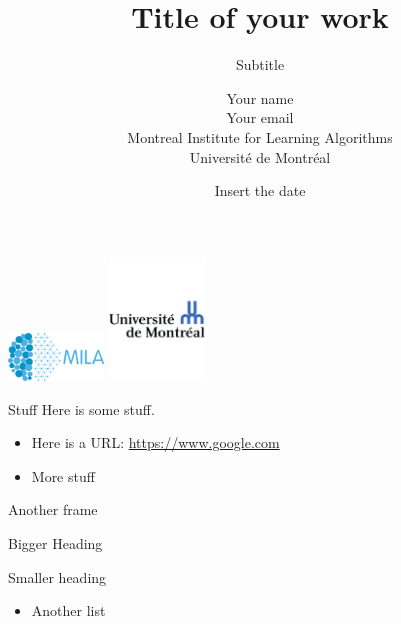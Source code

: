 \documentclass[a4paper,9pt]{beamer}
\title{Title of your work }
\subtitle{Subtitle}
\author[MILA]{%
Your name \\
Your email \\
Montreal Institute for Learning Algorithms\\
Université de Montréal}
\date{%
Insert the date
}
\begin{document}
\begin{frame}[plain]
  \titlepage
  \includegraphics[width=1in]{MILA_official_2016.png}
  \hfill
  \includegraphics[width=1in]{UdeM_logo.pdf}
\end{frame}


\begin{frame}{Stuff}
  Here is some stuff.

  \begin{itemize}
    \item Here is a URL: \url{https://www.google.com}
    \item More stuff
  \end{itemize}

\end{frame}


\begin{frame}{Another frame}
\huge
\begin{center}
Bigger Heading
\end{center}
\Large
Smaller heading
\normalsize
\begin{itemize}
\item Another list
\end{itemize}
\end{frame}
\end{document}
